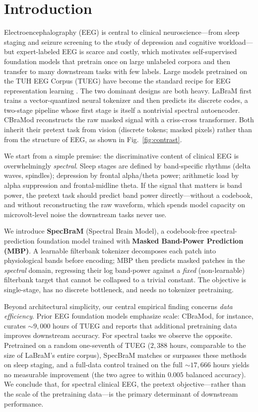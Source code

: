 \documentclass[letterpaper]{article} %
\begin{document}
\section{Introduction}
Electroencephalography (EEG) is central to clinical neuroscience---from sleep
staging and seizure screening to the study of depression and cognitive workload---but
expert-labeled EEG is scarce and costly, which motivates self-supervised foundation
models that pretrain once on large unlabeled corpora and then transfer to many
downstream tasks with few labels. Large models pretrained on the TUH EEG Corpus
(TUEG) \cite{obeid2016tuh} have become the standard recipe for EEG representation
learning \cite{jiang2024labram,wang2025cbramod}.
The two dominant designs are both heavy. LaBraM \cite{jiang2024labram} first
trains a vector-quantized neural tokenizer and then predicts its discrete codes,
a two-stage pipeline whose first stage is itself a nontrivial spectral
autoencoder. CBraMod \cite{wang2025cbramod} reconstructs the raw masked signal
with a criss-cross transformer. Both inherit their pretext task from vision
(discrete tokens; masked pixels) rather than from the structure of EEG, as shown
in Fig.~\ref{fig:contrast}.

We start from a simple premise: the discriminative content of clinical EEG is
overwhelmingly \emph{spectral}. Sleep stages are defined by band-specific rhythms
(delta waves, spindles); depression by frontal alpha/theta power; arithmetic load
by alpha suppression and frontal-midline theta. If the signal that matters is
band power, the pretext task should predict band power directly---without a
codebook, and without reconstructing the raw waveform, which spends model capacity on
microvolt-level noise the downstream tasks never use.

We introduce \textbf{SpecBraM} (Spectral Brain Model), a codebook-free
spectral-prediction foundation model trained with \textbf{Masked Band-Power
Prediction (MBP)}. A learnable filterbank tokenizer decomposes each patch into
physiological bands before encoding; MBP then predicts masked patches in the
\emph{spectral} domain, regressing their log band-power against a \emph{fixed}
(non-learnable) filterbank target that cannot be collapsed to a trivial constant.
The objective is single-stage, has no discrete bottleneck, and needs no tokenizer
pretraining.

Beyond architectural simplicity, our central empirical finding concerns
\emph{data efficiency}. Prior EEG foundation models emphasize scale: CBraMod, for
instance, curates ${\sim}9{,}000$ hours of TUEG and reports that additional
pretraining data improves downstream accuracy. For spectral tasks we observe the
opposite. Pretrained on a random one-seventh of TUEG ($2{,}388$ hours,
comparable to the size of LaBraM's entire corpus), SpecBraM matches or surpasses
these methods on sleep staging, and a full-data control trained on the full
${\sim}17{,}666$ hours yields no measurable improvement (the two agree to within
$0.005$ balanced accuracy). We conclude that, for spectral clinical EEG, the pretext
objective---rather than the scale of the pretraining data---is the primary
determinant of downstream performance.
\end{document}

